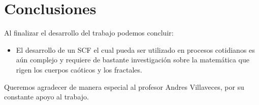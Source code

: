 \section{Conclusiones}

Al finalizar el desarrollo del trabajo podemos concluir:

\begin{itemize}
	\item El desarrollo de un SCF el cual pueda ser utilizado en procesos cotidianos es a\'un complejo y requiere de bastante investigaci\'on sobre la matem\'atica que rigen los cuerpos ca\'oticos y los fractales.

\end{itemize}

Queremos agradecer de manera especial al profesor Andres Villaveces, por su constante apoyo al trabajo.
